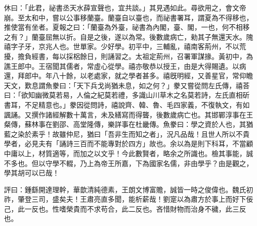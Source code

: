 \begin{pinyinscope}
休曰：「此君，祕書丞天水薛宣聲也，宜共談。」其見遇如此。尋欲用之，會文帝崩。至太和中，嘗以公事移蘭臺。蘭臺自以臺也，而祕書署耳，謂夏為不得移也，推使當有坐者。夏報之曰：「蘭臺為外臺，祕書為內閣，臺、閣，一也，何不相移之有？」蘭臺屈無以折。自是之後，遂以為常。後數歲病亡，勑其子無還天水。隗禧字子牙，京兆人也。世單家。少好學。初平中，三輔亂，禧南客荊州，不以荒擾，擔負經書，每以採梠餘日，則誦習之。太祖定荊州，召署軍謀掾。黃初中，為譙王郎中。王宿聞其儒者，常虛心從學。禧亦敬恭以授王，由是大得賜遺。以病還，拜郎中。年八十餘，以老處家，就之學者甚多。禧旣明經，又善星官，常仰瞻天文，歎息謂魚豢曰：「天下兵戈尚猶未息，如之何？」豢又嘗從問左氏傳，禧荅曰：「欲知幽微莫若易，人倫之紀莫若禮，多識山川草木之名莫若詩，左氏直相斫書耳，不足精意也。」豢因從問詩，禧說齊、韓、魯、毛四家義，不復執文，有如諷誦。又撰作諸經解數十萬言，未及繕寫而得聾，後數歲病亡也。其邯鄲淳事在王粲傳，蘇林事在劉邵、高堂隆傳，樂詳事在杜畿傳。魚豢曰：學之資於人也，其猶藍之染於素乎！故雖仲尼，猶曰「吾非生而知之者」，況凡品哉！且世人所以不貴學者，必見夫有「誦詩三百而不能專對於四方」故也。余以為是則下科耳，不當顧中庸以上，材質適等，而加之以文乎！今此數賢者，略余之所識也。檢其事能，誠不多也。但以守學不輟，乃上為帝王所嘉，下為國家名儒，非由學乎？由是觀之，學其胡可以已哉！

評曰：鍾繇開達理幹，華歆清純德素，王朗文博富贍，誠皆一時之俊偉也。魏氏初祚，肇登三司，盛矣夫！王肅亮直多聞，能析薪哉！劉寔以為肅方於事上而好下佞己，此一反也。性嗜榮貴而不求苟合，此二反也。吝惜財物而治身不穢，此三反也。


\end{pinyinscope}